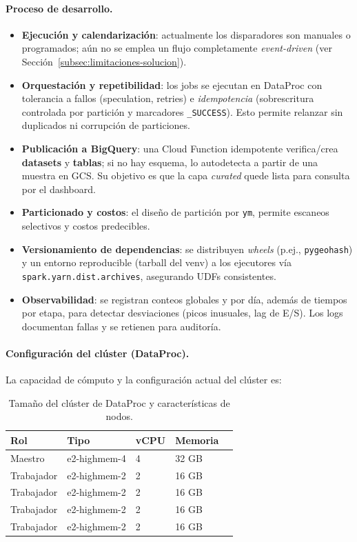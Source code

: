 \documentclass[10pt]{article}
\begin{document}
\paragraph{Proceso de desarrollo.}
\begin{itemize}
  \item \textbf{Ejecución y calendarización}: actualmente los disparadores son manuales o programados; aún no se emplea un flujo completamente \emph{event-driven} (ver Sección~\ref{subsec:limitaciones-solucion}). 
  \item \textbf{Orquestación y repetibilidad}: los jobs se ejecutan en DataProc con tolerancia a fallos (speculation, retries) e \emph{idempotencia} (sobrescritura controlada por partición y marcadores \texttt{\_SUCCESS}). Esto permite relanzar sin duplicados ni corrupción de particiones.
  \item \textbf{Publicación a BigQuery}: una Cloud Function idempotente verifica/crea \textbf{datasets} y \textbf{tablas}; si no hay esquema, lo autodetecta a partir de una muestra en GCS. Su objetivo es que la capa \textit{curated} quede lista para consulta por el dashboard.
  \item \textbf{Particionado y costos}: el diseño de partición por \texttt{ym}, permite escaneos selectivos y costos predecibles.
  \item \textbf{Versionamiento de dependencias}: se distribuyen \textit{wheels} (p.ej., \texttt{pygeohash}) y un entorno reproducible (tarball del venv) a los ejecutores vía \texttt{spark.yarn.dist.archives}, asegurando UDFs consistentes.
  \item \textbf{Observabilidad}: se registran conteos globales y por día, además de tiempos por etapa, para detectar desviaciones (picos inusuales, lag de E/S). Los logs documentan fallas y se retienen para auditoría.
\end{itemize}

\paragraph{Configuración del clúster (DataProc).}\label{sec:cluster}
La capacidad de cómputo y la configuración actual del clúster es:

\begin{table}[H]
  \centering
  \caption{Tamaño del clúster de DataProc y características de nodos.}
  \scriptsize
  \begin{tabular}{@{}lllll@{}}
    \toprule
    Rol & Tipo & vCPU & Memoria \\
    \midrule
    Maestro & e2-highmem-4 & 4 & 32 GB \\
    Trabajador & e2-highmem-2 & 2 & 16 GB \\
    Trabajador & e2-highmem-2 & 2 & 16 GB \\
    Trabajador & e2-highmem-2 & 2 & 16 GB \\
    Trabajador & e2-highmem-2 & 2 & 16 GB \\
    \bottomrule
  \end{tabular}
\end{table}
\end{document}
